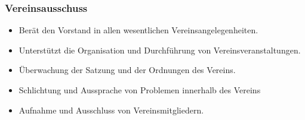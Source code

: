 \subsubsection{Vereinsausschuss}
\begin{itemize}
    \item Berät den Vorstand in allen wesentlichen Vereinsangelegenheiten.
    
    \item Unterstützt die Organisation und Durchführung von Vereinsveranstaltungen.
    
    \item Überwachung der Satzung und der Ordnungen des Vereins.
    
    \item Schlichtung und Aussprache von Problemen innerhalb des Vereins
    
    \item Aufnahme und Ausschluss von Vereinsmitgliedern.
\end{itemize}

